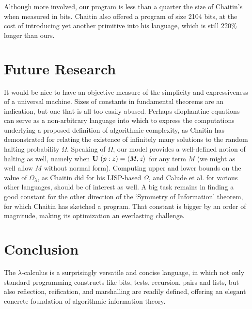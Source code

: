 \documentclass{article}
\newcommand{\tup}[1]{\langle #1 \rangle}
\newcommand{\pref}[2]{(#1:#2)}
\newcommand{\CU}{{\bf U}}
\begin{document}
Although more involved, our program is less than a quarter the size of Chaitin's
when measured in bits. Chaitin also offered a program of size 2104 bits,
at the cost of introducing yet another primitive into his language,
which is still 220\% longer than ours.


\section{Future Research}
It would be nice to have an objective measure of the simplicity and expressiveness
of a universal machine. Sizes of constants in fundamental theorems are an indication,
but one that is all too easily abused. Perhaps diophantine equations can serve as
a non-arbitrary language into which to express the computations underlying a proposed
definition of algorithmic complexity, as Chaitin has demonstrated for relating the existence
of infinitely many solutions to the random halting probability $\Omega$.
Speaking of $\Omega$, our model provides a well-defined notion of halting as well,
namely when $\CU\ \pref{p}{z} = \tup{M,z}$ for any term $M$ (we might as well allow $M$ without
normal form). Computing upper and lower bounds on the value of $\Omega_{\lambda}$,
as Chaitin did for his LISP-based $\Omega$, and Calude et al. for various other languages,
should be of interest as well.
A big task remains in finding a good constant for the other direction of
the `Symmetry of Information' theorem, for which Chaitin has sketched a program.
That constant is bigger by an order of magnitude, making its optimization
an everlasting challenge.

\section{Conclusion}
The $\lambda$-calculus is a surprisingly versatile and concise language,
in which not only standard programming constructs like bits, tests, recursion,
pairs and lists, but also reflection, reification, and marshalling are
readily defined, offering an elegant concrete foundation
of algorithmic information theory.
\end{document}

